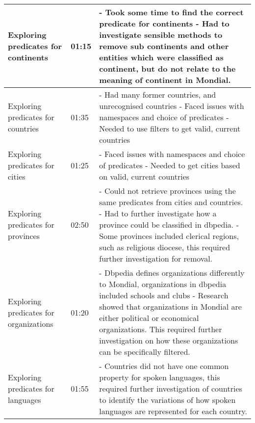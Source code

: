 \documentclass[11pt]{article}
\begin{document}
\begin{longtable}{|p{3.9cm}|p{4.05cm}|p{6.8cm}|}
    Exploring predicates for continents & 01:15 & 
        - Took some time to find the correct predicate for continents \newline
        - Had to investigate sensible methods to remove sub continents and other entities which
        were classified as continent, but do not relate to the meaning of continent in Mondial.
    \\
    \hline
    Exploring predicates for countries & 01:35 & 
        - Had many former countries, and unrecognised countries \newline
        - Faced issues with namespaces and choice of predicates \newline
        - Needed to use filters to get valid, current countries
    \\
    \hline
    Exploring predicates for cities & 01:25 & 
        - Faced issues with namespaces and choice of predicates \newline
        - Needed to get cities based on valid, current countries
    \\
    \hline
    Exploring predicates for provinces & 02:50 & 
        - Could not retrieve provinces using the same predicates from cities and countries.  \newline
        - Had to further investigate how a province could be classified in dbpedia. \newline
        - Some provinces included clerical regions, such as religious diocese, this required further investigation for removal.
    \\
    \hline
    Exploring predicates for organizations & 01:20 & 
        - Dbpedia defines organizations differently to Mondial, organizations in dbpedia included schools and clubs \newline
        - Research showed that organizations in Mondial are either political or economical organizations. This required
        further investigation on how these organizations can be specifically filtered.
    \\
    \hline
    Exploring predicates for languages & 01:55 & 
        - Countries did not have one common property for spoken languages, this required further investigation of countries to identify the
        variations of how spoken languages are represented for each country.
    \\
    \hline
\end{longtable}
\end{document}
